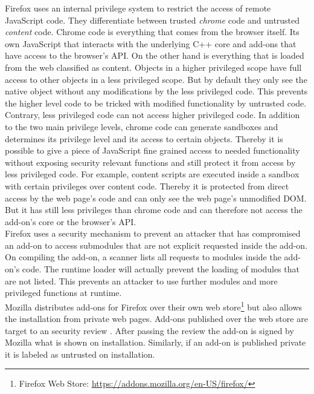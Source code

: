 \documentclass[article,colorback,accentcolor=tud9c,type=bsc]{tudthesis}
\begin{document}
	Firefox uses an internal privilege system to restrict the access of remote JavaScript code. They differentiate between trusted \textit{chrome} code and untrusted \textit{content} code. Chrome code is everything that comes from the browser itself. Its own JavaScript that interacts with the underlying C++ core and add-ons that have access to the browser's API. On the other hand is everything that is loaded from the web classified as content. Objects in a higher privileged scope have full access to other objects in a less privileged scope. But by default they only see the native object without any modifications by the less privileged code. This prevents the higher level code to be tricked with modified functionality by untrusted code. Contrary, less privileged code can not access higher privileged code. In addition to the two main privilege levels, chrome code can generate sandboxes and determines its privilege level and its access to certain objects. Thereby it is possible to give a piece of JavaScript fine grained access to needed functionality without exposing security relevant functions and still protect it from access by less privileged code. For example, content scripts are executed inside a sandbox with certain privileges over content code. Thereby it is protected from direct access by the web page's code and can only see the web page's unmodified DOM. But it has still less privileges than chrome code and can therefore not access the add-on's core or the browser's API. \\
	Firefox uses a security mechanism to prevent an attacker that has compromised an add-on to access submodules that are not explicit requested inside the add-on. On compiling the add-on, a scanner lists all requests to modules inside the add-on's code. The runtime loader will actually prevent the loading of modules that are not listed. This prevents an attacker to use further modules and more privileged functions at runtime. \\

	Mozilla distributes add-ons for Firefox over their own web store\footnote{Firefox Web Store: \url{https://addons.mozilla.org/en-US/firefox/}} but also allows the installation from private web pages. Add-ons published over the web store are target to an security review \cite{mozillaDevReviewPolicy}. After passing the review the add-on is signed by Mozilla what is shown on installation. Similarly, if an add-on is published private it is labeled as untrusted on installation. 
\end{document}
